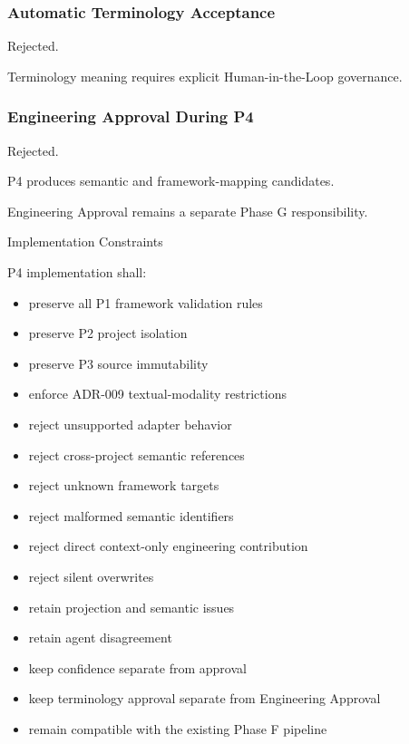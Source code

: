 \hypertarget{automatic-terminology-acceptance}{%
\subsubsection{Automatic Terminology Acceptance}\label{automatic-terminology-acceptance}}

Rejected.

Terminology meaning requires explicit Human-in-the-Loop governance.

\hypertarget{engineering-approval-during-p4}{%
\subsubsection{Engineering Approval During P4}\label{engineering-approval-during-p4}}

Rejected.

P4 produces semantic and framework-mapping candidates.

Engineering Approval remains a separate Phase G responsibility.

Implementation Constraints

P4 implementation shall:

\begin{itemize}
\tightlist
\item
  preserve all P1 framework validation rules
\item
  preserve P2 project isolation
\item
  preserve P3 source immutability
\item
  enforce ADR-009 textual-modality restrictions
\item
  reject unsupported adapter behavior
\item
  reject cross-project semantic references
\item
  reject unknown framework targets
\item
  reject malformed semantic identifiers
\item
  reject direct context-only engineering contribution
\item
  reject silent overwrites
\item
  retain projection and semantic issues
\item
  retain agent disagreement
\item
  keep confidence separate from approval
\item
  keep terminology approval separate from Engineering Approval
\item
  remain compatible with the existing Phase F pipeline
\end{itemize}

